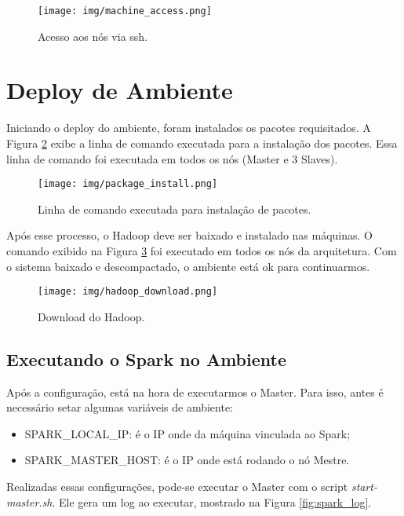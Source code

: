 \documentclass{article}
\begin{document}
\begin{figure}[H]
  \texttt{[image: img/machine\_access.png]}
  \caption{Acesso aos nós via ssh.}
  \label{fig:machine_access}
\end{figure}

\newpage
\section{Deploy de Ambiente}

Iniciando o deploy do ambiente, foram instalados os pacotes requisitados. A Figura \ref{fig:package_install} exibe a linha de comando executada
para a instalação dos pacotes. Essa linha de comando foi executada em todos os nós (Master e 3 Slaves).

\begin{figure}[H]
  \texttt{[image: img/package\_install.png]}
  \caption{Linha de comando executada para instalação de pacotes.}
  \label{fig:package_install}
\end{figure}

Após esse processo, o Hadoop deve ser baixado e instalado nas máquinas. O comando exibido na Figura \ref{fig:hadoop_dl} foi executado em todos os nós da arquitetura.
Com o sistema baixado e descompactado, o ambiente está ok para continuarmos.

\begin{figure}[H]
  \texttt{[image: img/hadoop\_download.png]}
  \caption{Download do Hadoop.}
  \label{fig:hadoop_dl}
\end{figure}

\subsection{Executando o Spark no Ambiente}

Após a configuração, está na hora de executarmos o Master. Para isso, antes é necessário setar algumas variáveis de ambiente:


\begin{itemize}
\item SPARK\_LOCAL\_IP: é o IP onde da máquina vinculada ao Spark;
\item SPARK\_MASTER\_HOST: é o IP onde está rodando o nó Mestre.
\end{itemize}

Realizadas essas configurações, pode-se executar o Master com o script \emph{start-master.sh}. Ele gera um log ao executar, mostrado na Figura \ref{fig:spark_log}.
\end{document}
